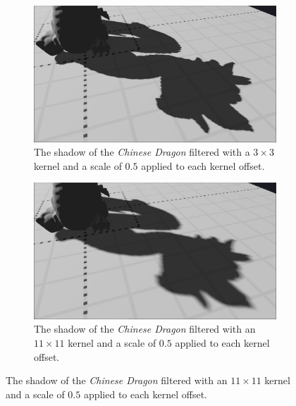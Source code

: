 \begin{figure}[p]
    \begin{subfigure}[t]{0.48\textwidth}
		\centering
        \includegraphics[width=\textwidth]{./graf/tests/pcf/cropped/dragon_pcf_fhd_1024_3x3_offset05.png}
        \caption{The shadow of the \textit{Chinese Dragon} filtered with a \(3\times 3\) kernel and a scale of \(0.5\) applied to each kernel offset.}
    \end{subfigure}
    \hfill
    \begin{subfigure}[t]{0.48\textwidth}
		\centering
        \includegraphics[width=\textwidth]{./graf/tests/pcf/cropped/dragon_pcf_fhd_1024_11x11_offset05.png}
        \caption{The shadow of the \textit{Chinese Dragon} filtered with an \(11\times 11\) kernel and a scale of \(0.5\) applied to each kernel offset.}
    \end{subfigure}


\end{figure}
